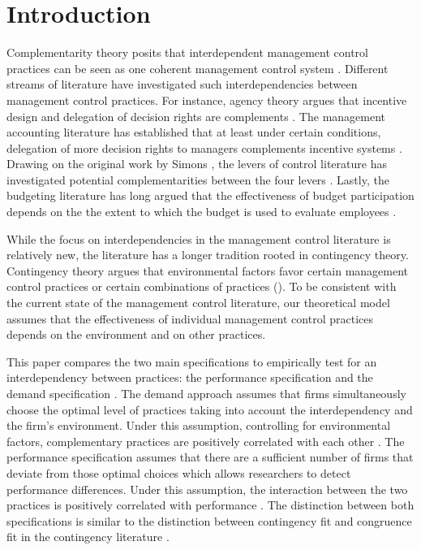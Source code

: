 \documentclass[12pt]{article}
\begin{document}
\section{Introduction}\label{introduction}

 Complementarity theory posits that interdependent management control practices can be seen as one coherent management control system \citep{Milgrom1995, Grabner2013}. Different streams of literature have investigated such interdependencies between management control practices. For instance, agency theory argues that incentive design and delegation of decision rights are complements \citep{Holmstrom1994}. The management accounting literature has established that at least under certain conditions, delegation of more decision rights to managers complements incentive systems \citep{Moers2006, Indjejikian2012, Bouwens2007}. Drawing on the original work by Simons \citetext{\citeyear{Simons1995}; \citeyear{Simons2000}}, the levers of control literature has investigated potential complementarities between the four levers \citep{Widener2007}. Lastly, the budgeting literature has long argued that the effectiveness of budget participation depends on the the extent to which the budget is used to evaluate employees \citep{Brownell1991, Dunk1993}.
 
While the focus on interdependencies in the management control literature is relatively new, the literature has a longer tradition rooted in contingency theory.  Contingency theory argues that environmental factors favor certain management control practices or certain combinations of practices (\citet{Grabner2013,Chenhall2003}). To be consistent with the current state of the management control literature, our theoretical model assumes that the effectiveness of individual management control practices depends on the environment and on other practices.
 
This paper compares the two main specifications to empirically test for an interdependency between practices: the performance specification and the demand specification \citep{Grabner2013}. The demand approach assumes that firms simultaneously choose the optimal level of practices taking into account the interdependency and the firm's environment. Under this assumption, controlling for environmental factors, complementary practices are positively correlated with each other \citep{Arora1996,Grabner2013,Johansson2018, Hofmann2015OrganizationalChoices}. The performance specification assumes that there are a sufficient number of firms that deviate from those optimal choices which allows researchers to detect performance differences. Under this assumption, the interaction between the two practices is positively correlated with performance \citep{Athey1998,Carree2011, Grabner2013, Hofmann2015OrganizationalChoices}. The distinction between both specifications is similar to the distinction between contingency fit and congruence fit in the contingency literature \citep{VandeVen1985a, Gerdin2004}. 
\end{document}
